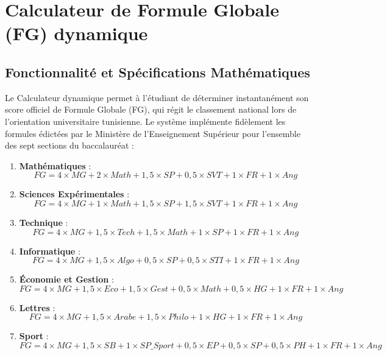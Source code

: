 \section{Calculateur de Formule Globale (FG) dynamique}
\label{sec:calculateur_fg}

\subsection{Fonctionnalité et Spécifications Mathématiques}

Le Calculateur dynamique permet à l'étudiant de déterminer instantanément son score officiel de Formule Globale (FG), qui régit le classement national lors de l'orientation universitaire tunisienne. Le système implémente fidèlement les formules édictées par le Ministère de l'Enseignement Supérieur pour l'ensemble des sept sections du baccalauréat :

\begin{enumerate}
    \item \textbf{Mathématiques} :
    $$FG = 4 \times MG + 2 \times Math + 1{,}5 \times SP + 0{,}5 \times SVT + 1 \times FR + 1 \times Ang$$
    
    \item \textbf{Sciences Expérimentales} :
    $$FG = 4 \times MG + 1 \times Math + 1{,}5 \times SP + 1{,}5 \times SVT + 1 \times FR + 1 \times Ang$$
    
    \item \textbf{Technique} :
    $$FG = 4 \times MG + 1{,}5 \times Tech + 1{,}5 \times Math + 1 \times SP + 1 \times FR + 1 \times Ang$$
    
    \item \textbf{Informatique} :
    $$FG = 4 \times MG + 1{,}5 \times Algo + 0{,}5 \times SP + 0{,}5 \times STI + 1 \times FR + 1 \times Ang$$
    
    \item \textbf{Économie et Gestion} :
    $$FG = 4 \times MG + 1{,}5 \times Eco + 1{,}5 \times Gest + 0{,}5 \times Math + 0{,}5 \times HG + 1 \times FR + 1 \times Ang$$
    
    \item \textbf{Lettres} :
    $$FG = 4 \times MG + 1{,}5 \times Arabe + 1{,}5 \times Philo + 1 \times HG + 1 \times FR + 1 \times Ang$$
    
    \item \textbf{Sport} :
    $$FG = 4 \times MG + 1{,}5 \times SB + 1 \times SP\_Sport + 0{,}5 \times EP + 0{,}5 \times SP + 0{,}5 \times PH + 1 \times FR + 1 \times Ang$$
\end{enumerate}

